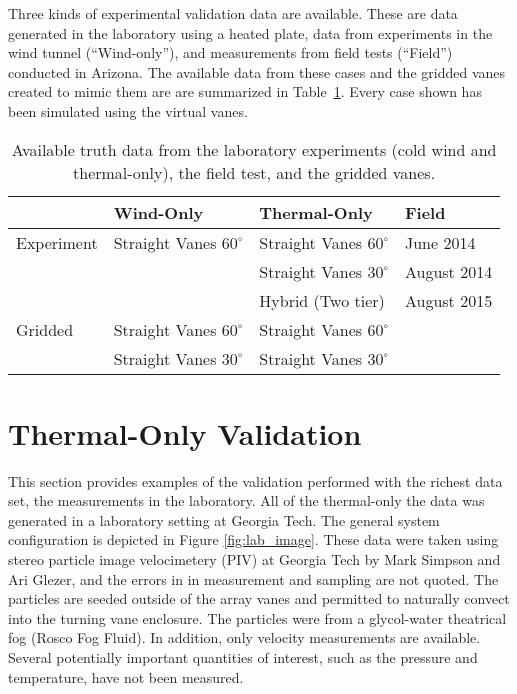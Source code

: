Three kinds of experimental validation data are available. These are
data generated in the laboratory using a heated plate, data from
experiments in the wind tunnel (``Wind-only''), and measurements from field
tests (``Field'') conducted in Arizona. The available data from
these cases and the gridded vanes created to mimic them are are
summarized in Table~\ref{tab:val_data}. Every case shown has been
simulated using the virtual vanes.   

\begin{table}[h]
\centering
\label{my-label}
\begin{tabular}{l|l|l|l|}
           & Wind-Only                   & Thermal-Only                & Field  \\
  \hline 
Experiment & Straight Vanes $60^{\circ}$ & Straight Vanes $60^{\circ}$ & June 2014   \\
           &                           & Straight Vanes $30^{\circ}$   & August 2014 \\
           &                           & Hybrid (Two tier)             & August 2015 \\
  \hline 
Gridded    & Straight Vanes $60^{\circ}$ & Straight Vanes $60^{\circ}$ & \\
           & Straight Vanes $30^{\circ}$ & Straight Vanes $30^{\circ}$ & \\
  \hline 
\end{tabular}
  \caption{Available truth data from the laboratory experiments 
    (cold wind and thermal-only), the field test, and the gridded vanes.} 
  \label{tab:val_data}
\end{table}
%
%
%
%
%


%
%
\section{Thermal-Only Validation}
This section provides examples of the validation performed with the
richest data set, the measurements in the laboratory. All of the
thermal-only the data was generated in a laboratory setting at Georgia
Tech. The general system configuration is depicted in Figure
\ref{fig:lab_image}. These data were taken using stereo particle image
velocimetery (PIV) at Georgia Tech by Mark Simpson and Ari Glezer, and
the errors in in measurement and sampling are 
not quoted. The particles are seeded outside of the array vanes and
permitted to naturally convect into the turning vane enclosure. The
particles were from a glycol-water theatrical fog (Rosco Fog Fluid). 
In addition, only velocity measurements are available. Several
potentially important quantities of interest, such as the pressure and
temperature, have not been measured.  

